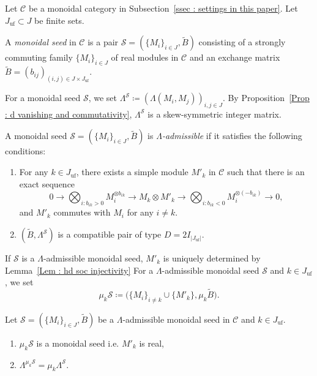 Let $\mathscr{C}$ be a monoidal category
in Subsection~\ref{ssec : settings in this paper}.
Let $J_{\mathrm{uf}} \subset J$ be finite sets.

\begin{Def}
\label{Def : monoidal seed}
A \emph{monoidal seed} in $\mathscr{C}$ is a pair
$\mathscr{S} = (\{M_i\}_{i \in J}, \widetilde{B})$
consisting of a strongly commuting family $\{M_i\}_{i \in J}$
of real modules in $\mathscr{C}$ and an exchange matrix
$\widetilde{B} = (b_{ij})_{(i, j) \in J \times J_{\mathrm{uf}}}$.
\end{Def}

For a monoidal seed $\mathscr{S}$, we set
$\Lambda^{\mathscr{S}} \coloneq (\Lambda(M_i, M_j))_{i, j \in J}$.
By Proposition~\ref{Prop : d vanishing and commutativity},
$\Lambda^{\mathscr{S}}$ is a skew-symmetric integer matrix.

\begin{Def}
\label{Def : Lambda admissible monoidal seed}
A monoidal seed
$\mathscr{S} = (\{M_i\}_{i \in J}, \widetilde{B})$
is \emph{$\Lambda$-admissible}
if it satisfies the following conditions:
\begin{enumerate}
    \item[(i)] For any $k \in J_{\mathrm{uf}}$,
    there exists a simple module $M'_k$ in $\mathscr{C}$
    such that there is an exact sequence
    \[
    0 \longrightarrow
    \bigotimes_{i : b_{ik} > 0}M_i^{\otimes b_{ik}}
    \longrightarrow M_k \otimes M'_k
    \longrightarrow
    \bigotimes_{i : b_{ik} < 0}M_i^{\otimes(-b_{ik})}
    \longrightarrow 0,
    \]
    and $M'_k$ commutes with $M_i$ for any $i \neq k$.
    \item[(ii)] $(\widetilde{B}, \Lambda^{\mathscr{S}})$
    is a compatible pair of type $D = 2I_{|J_{\mathrm{uf}}|}$.
\end{enumerate}
\end{Def}

If $\mathscr{S}$ is a $\Lambda$-admissible monoidal seed,
$M'_k$ is uniquely determined by Lemma~\ref{Lem : hd soc injectivity}
For a $\Lambda$-admissible monoidal seed $\mathscr{S}$
and $k \in J_{\mathrm{uf}}$, we set
\[
\mu_k\mathscr{S}
\coloneq
\bigl(\{M_i\}_{i \neq k} \cup \{M'_k\}, \mu_k\widetilde{B}\bigr).
\]

\begin{Prop}
\label{Prop : mutation of Lambda admissible monoidal seeds}
Let $\mathscr{S} = (\{M_i\}_{i \in J}, \widetilde{B})$
be a $\Lambda$-admissible monoidal seed in $\mathscr{C}$
and $k \in J_{\mathrm{uf}}$.
\begin{enumerate}
    \item[(i)] $\mu_k\mathscr{S}$ is a monoidal seed i.e. $M'_k$ is real,
    \item[(ii)] $\Lambda^{\mu_k\mathscr{S}}
    = \mu_k\Lambda^{\mathscr{S}}$.
\end{enumerate}
\end{Prop}

